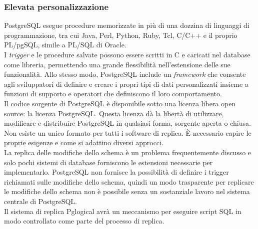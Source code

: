 \subsubsection{Elevata personalizzazione}
PostgreSQL esegue procedure memorizzate in pi\`{u} di una dozzina di linguaggi di programmazione, tra cui Java, Perl, Python, Ruby, Tcl, C/C++ e il proprio PL/pgSQL, simile a PL/SQL di Oracle. \\
I \textit{trigger} e le procedure salvate possono essere scritti in C e caricati nel database come libreria, permettendo una grande flessibilit\`{a} nell'estensione delle sue funzionalit\`{a}. Allo stesso modo, PostgreSQL include un \textit{framework} che consente agli sviluppatori di definire e creare i propri tipi di dati personalizzati insieme a funzioni di supporto e operatori che definiscono il loro comportamento.\\

Il codice sorgente di PostgreSQL \`{e} disponibile sotto una licenza libera open source: la licenza PostgreSQL. Questa licenza d\`{a} la libert\`{a} di utilizzare, modificare e distribuire PostgreSQL in qualsiasi forma, sorgente aperta o chiusa\cite{etichetta15}.\\

Non esiste un unico formato per tutti i software di replica. \`{E} necessario capire le proprie esigenze e come si adattino diversi approcci.\\

La replica delle modifiche dello schema \`{e} un problema frequentemente discusso e solo pochi sistemi di database forniscono le estensioni necessarie per implementarlo. PostgreSQL non fornisce la possibilit\`{a} di definire i trigger richiamati sulle modifiche dello schema, quindi un modo trasparente per replicare le modifiche dello schema non \`{e} possibile senza un sostanziale lavoro nel sistema centrale di PostgreSQL.\\
Il sistema di replica Pglogical avr\`{a} un meccanismo per eseguire script SQL in modo controllato come parte del processo di replica.

